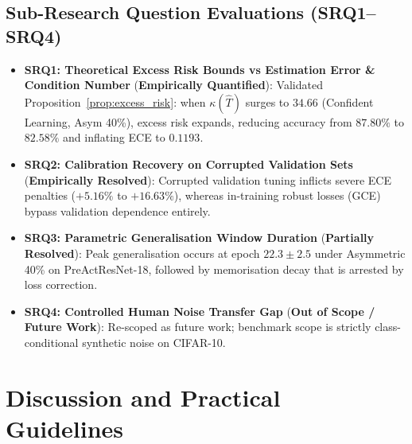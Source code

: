 \documentclass[journal]{IEEEtran}
\theoremstyle{definition}
\begin{document}
\subsection{Sub-Research Question Evaluations (SRQ1--SRQ4)}
\begin{itemize}
    \item \textbf{SRQ1: Theoretical Excess Risk Bounds vs Estimation Error \& Condition Number} (\textbf{Empirically Quantified}): Validated Proposition~\ref{prop:excess_risk}: when $\kappa(\hat{T})$ surges to $34.66$ (Confident Learning, Asym 40\%), excess risk expands, reducing accuracy from $87.80\%$ to $82.58\%$ and inflating ECE to $0.1193$.
    \item \textbf{SRQ2: Calibration Recovery on Corrupted Validation Sets} (\textbf{Empirically Resolved}): Corrupted validation tuning inflicts severe ECE penalties ($+5.16\%$ to $+16.63\%$), whereas in-training robust losses (GCE) bypass validation dependence entirely.
    \item \textbf{SRQ3: Parametric Generalisation Window Duration} (\textbf{Partially Resolved}): Peak generalisation occurs at epoch $22.3 \pm 2.5$ under Asymmetric 40\% on PreActResNet-18, followed by memorisation decay that is arrested by loss correction.
    \item \textbf{SRQ4: Controlled Human Noise Transfer Gap} (\textbf{Out of Scope / Future Work}): Re-scoped as future work; benchmark scope is strictly class-conditional synthetic noise on CIFAR-10.
\end{itemize}

\section{Discussion and Practical Guidelines}
\end{document}
